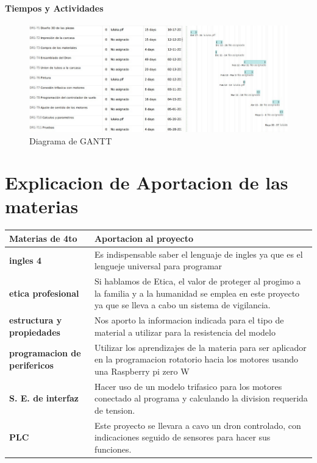 \documentclass[11pt,a4paper]{article}
\begin{document}
\subsection{Tiempos y Actividades}

\begin{figure}[h]
\centering
\includegraphics[scale=.5]{FFFFFFFFFF2}
\caption{Diagrama de GANTT}
\end{figure}


\newpage

\part{Explicacion de Aportacion de las materias}

\begin{tabular}{|p{5.5cm}|p{7cm}|}
\hline 
\textbf{Materias de 4to} & \textbf{Aportacion al proyecto} \\ \hline
\textbf{ingles 4} & Es indispensable saber el lenguaje de  ingles ya que es el lengueje universal para programar \\ \hline
\textbf{etica profesional} & Si hablamos de Etica, el valor de proteger al progimo a la familia y a la humanidad  se emplea en este proyecto ya que se lleva a cabo un sistema de vigilancia. \\ \hline
\textbf{estructura y propiedades} & Nos aporto la informacion indicada para el tipo de material a utilizar para la resistencia  del modelo \\ \hline
\textbf{programacion de perifericos} & Utilizar los aprendizajes de la materia para ser aplicador en la programacion rotatorio hacia los motores usando una Raspberry pi zero W \\ \hline
\textbf{S. E. de interfaz} & Hacer uso de un modelo trifasico para los motores conectado al programa y calculando la division requerida de tension.  \\ \hline
\textbf{PLC} & Este proyecto se llevara a cavo un dron controlado, con indicaciones seguido de sensores para hacer sus funciones. \\ \hline
\end{tabular}
\end{document}
